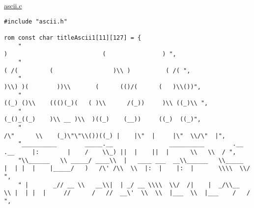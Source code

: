 \underline{ascii.c}
\begin{lstlisting}
#include "ascii.h"

rom const char titleAscii1[11][127] = {
	"                                                                               )                           (                ) ",
	"                                                                            ( /(         (                 )\\ )          ( /( ", 
	"                                                                           )\\) )(        ))\\       (      (()/(      (   )\\())",
	"                                                                          ((_) ()\\    ((()(_)(   ( )\\      /(_))     )\\ ((_)\\ ",
	"                                                                          (_()_((_)    )\\ __ )\\  )((_)    (__))     ((_)  ((_)",
	"                                                                          /\"      \\    (_)\"\"\\())((_) |    |\"  |     |\"  \\/\"  |",
	"__________        _____.__                __________        .__  .__     |:        |    /    \\_) ||  |    ||  |      \\   \\  / ",
	"\\______   \\ _____/ ____\\  |   ____ ___  __\\______   \\_____  |  | |  |    |_____/   )   /\' /\\  \\  |:  |    |:  |       \\\\  \\/  ",
	" |       _// __ \\   __\\|  | _/ __ \\\\  \\/  /|    |  _/\\__  \\ |  | |  |     //      /   //  __\'  \\  \\  |___  \\  |___    /   /   ",

\end{lstlisting}
